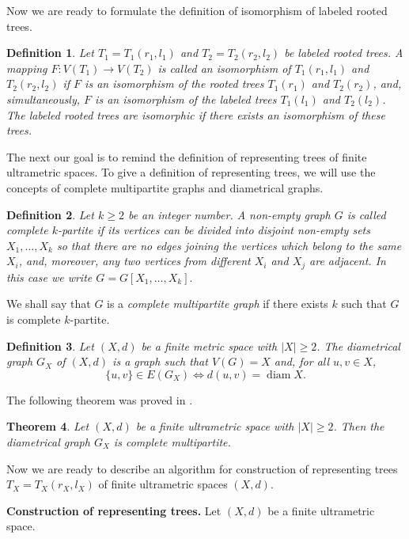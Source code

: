 \documentclass{raex}
\newtheorem{thm}{Theorem}[section]
\newtheorem{defn}[thm]{Definition}
\theoremstyle{definition}
\theoremstyle{remark}
\numberwithin{equation}{section}
\begin{document}
Now we are ready to formulate the definition of isomorphism of labeled rooted trees.

\begin{defn}\label{saq}
Let $T_1=T_1(r_1,l_1)$ and $T_2=T_2(r_2,l_2)$ be labeled rooted trees.
A mapping $F:V(T_1)\to V(T_2)$  is called an isomorphism of 
$T_1(r_1,l_1)$ and $T_2(r_2,l_2)$ if 
$F$ is an isomorphism 
of the rooted trees
$T_1(r_1)$ and $T_2(r_2)$, and, 
simultaneously, $F$ is an isomorphism of the labeled trees $T_1(l_1)$ and $T_2(l_2)$. The labeled rooted trees are isomorphic if there exists an isomorphism of these trees.
\end{defn}


The next our goal is to remind the definition of representing trees of finite ultrametric spaces. To give a definition of representing trees, we will use the concepts of complete multipartite graphs and diametrical graphs.


\begin{defn}\label{edrtaa}
Let $k\geq 2$ be an integer number.
A non-empty graph $G$ is called complete $k$-partite if its vertices can be divided into disjoint non-empty sets $X_1,\ldots,X_k$ so that there are no edges joining the vertices which belong to the same $X_i$, and, moreover, any two vertices from different $X_i$ and $X_j$ are adjacent. In this case we write
\(
G=G[X_1,\ldots,X_k].
\)
\end{defn}

We shall say that $G$ is a \emph{complete multipartite graph} if there exists $k$ such that $G$ is complete $k$-partite.


\begin{defn}\label{okiu}
Let $(X,d)$ be a finite metric space with $|X|\geq 2$. The diametrical graph $G_X$ of $(X,d)$ is a graph such that $V(G)=X$ and, for all $u,v\in X$,
\[
\{u,v\}\in E(G_{X})
\iff
d(u,v)=\operatorname{diam}X.
\]
\end{defn}

The following theorem was proved in \cite{DDP2011pNUAA}.

\begin{thm}\label{kmjkusa}
Let $(X,d)$ be a finite ultrametric space with $|X|\geq 2$. Then the diametrical graph
\(
G_{X}
\)
is complete multipartite.
\end{thm}


Now we are ready to describe an algorithm for construction of representing trees $T_X=T_X(r_X,l_X)$ of finite ultrametric spaces $(X,d)$.


{\bf Construction of representing trees.} 
 Let $(X,d)$ be a finite ultrametric space. 
 
\end{document}
